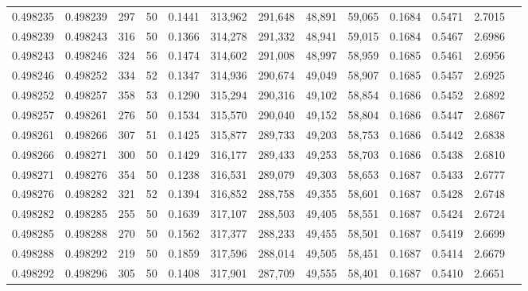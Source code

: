 \begin{tabular}{rrrrrrrrrrrrr}
0.498235 & 0.498239 & 297 &  50 &                                     0.1441 & 313,962 & 291,648 &  48,891 &  59,065 & 0.1684 & 0.5471 & 2.7015 \\
0.498239 & 0.498243 & 316 &  50 &                                     0.1366 & 314,278 & 291,332 &  48,941 &  59,015 & 0.1684 & 0.5467 & 2.6986 \\
0.498243 & 0.498246 & 324 &  56 &                                     0.1474 & 314,602 & 291,008 &  48,997 &  58,959 & 0.1685 & 0.5461 & 2.6956 \\
0.498246 & 0.498252 & 334 &  52 &                                     0.1347 & 314,936 & 290,674 &  49,049 &  58,907 & 0.1685 & 0.5457 & 2.6925 \\
0.498252 & 0.498257 & 358 &  53 &                                     0.1290 & 315,294 & 290,316 &  49,102 &  58,854 & 0.1686 & 0.5452 & 2.6892 \\
0.498257 & 0.498261 & 276 &  50 &                                     0.1534 & 315,570 & 290,040 &  49,152 &  58,804 & 0.1686 & 0.5447 & 2.6867 \\
0.498261 & 0.498266 & 307 &  51 &                                     0.1425 & 315,877 & 289,733 &  49,203 &  58,753 & 0.1686 & 0.5442 & 2.6838 \\
0.498266 & 0.498271 & 300 &  50 &                                     0.1429 & 316,177 & 289,433 &  49,253 &  58,703 & 0.1686 & 0.5438 & 2.6810 \\
0.498271 & 0.498276 & 354 &  50 &                                     0.1238 & 316,531 & 289,079 &  49,303 &  58,653 & 0.1687 & 0.5433 & 2.6777 \\
0.498276 & 0.498282 & 321 &  52 &                                     0.1394 & 316,852 & 288,758 &  49,355 &  58,601 & 0.1687 & 0.5428 & 2.6748 \\
0.498282 & 0.498285 & 255 &  50 &                                     0.1639 & 317,107 & 288,503 &  49,405 &  58,551 & 0.1687 & 0.5424 & 2.6724 \\
0.498285 & 0.498288 & 270 &  50 &                                     0.1562 & 317,377 & 288,233 &  49,455 &  58,501 & 0.1687 & 0.5419 & 2.6699 \\
0.498288 & 0.498292 & 219 &  50 &                                     0.1859 & 317,596 & 288,014 &  49,505 &  58,451 & 0.1687 & 0.5414 & 2.6679 \\
0.498292 & 0.498296 & 305 &  50 &                                     0.1408 & 317,901 & 287,709 &  49,555 &  58,401 & 0.1687 & 0.5410 & 2.6651 \\

\end{tabular}
